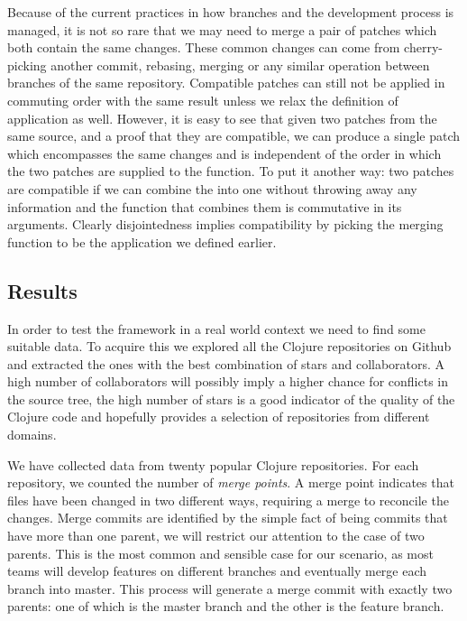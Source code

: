 \documentclass[11pt, titlepage]{article}
\begin{document}
Because of the current practices in how branches and the development process is managed, it is not so rare that we may need to merge a pair of patches which both contain the same changes. These common changes can come from cherry-picking another commit, rebasing, merging or any similar operation between branches of the same repository. Compatible patches can still not be applied in commuting order with the same result unless we relax the definition of application as well. However, it is easy to see that given two patches from the same source, and a proof that they are compatible, we can produce a single patch which encompasses the same changes and is independent of the order in which the two patches are supplied to the function. To put it another way: two patches are compatible if we can combine the into one without throwing away any information and the function that combines them is commutative in its arguments.
Clearly disjointedness implies compatibility by picking the merging function to be the application we defined earlier.


\subsection{Results}
In order to test the framework in a real world context we need to find some suitable data. To acquire this we explored all the Clojure repositories on Github and extracted the ones with the best combination of stars and collaborators. A high number of collaborators will possibly imply a higher chance for conflicts in the source tree, the high number of stars is a good indicator of the quality of the Clojure code and hopefully provides a selection of repositories from different domains.

We have collected data from twenty popular Clojure repositories. For each
repository, we counted the number of \emph{merge points}.  A merge
point indicates that files have been changed in two different ways,
requiring a merge to reconcile the changes.
Merge commits are identified by the simple fact of being commits that have more than one parent, we will restrict our attention to the case of two parents. This is the most common and sensible case for our scenario, as most teams will develop features on different branches and eventually merge each branch into master. 
This process will generate a merge commit with exactly two parents: one of which is the master branch and the other is the feature branch.
\end{document}
